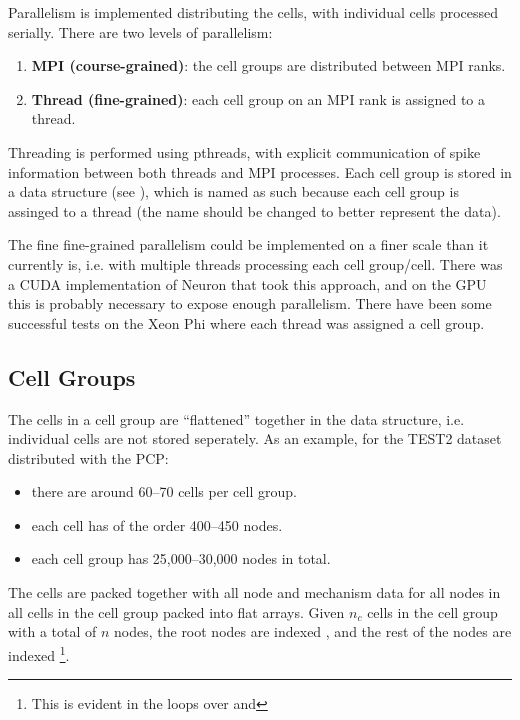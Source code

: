 Parallelism is implemented distributing the cells, with individual cells processed serially.
There are two levels of parallelism:
\begin{enumerate}
\item
    \textbf{MPI (course-grained)}: the cell groups are distributed between MPI ranks.
\item
    \textbf{Thread (fine-grained)}: each cell group on an MPI rank is assigned to a thread.
\end{enumerate}
Threading is performed using pthreads, with explicit communication of spike information between both threads and MPI processes.
Each cell group is stored in a  data structure (see ), which is named as such because each cell group is assinged to a thread (the name should be changed to better represent the data).

\begin{note}
The fine fine-grained parallelism could be implemented on a finer scale than it currently is, i.e. with multiple threads processing each cell group/cell. There was a CUDA implementation of Neuron that took this approach, and on the GPU this is probably necessary to expose enough parallelism. There have been some successful tests on the Xeon Phi where each thread was assigned a cell group.
\end{note}
\subsection{Cell Groups}
The cells in a cell group are ``flattened'' together in the  data structure, i.e. individual cells are not stored seperately.
As an example, for the TEST2 dataset distributed with the PCP:
    \begin{itemize}
    \item
        there are around 60--70 cells per cell group.
    \item
        each cell has of the order 400--450 nodes.
    \item
        each cell group has 25,000--30,000 nodes in total.
    \end{itemize}
    The cells are packed together with all node and mechanism data for all nodes in all cells in the cell group packed into flat arrays.
        Given $n_c$ cells in the cell group with a total of $n$ nodes, the root nodes are indexed \lst{[1:n_c]}, and the rest of the nodes are indexed \lst{[n_c+1:n]}\footnote{This is evident in the loops over  and }.

